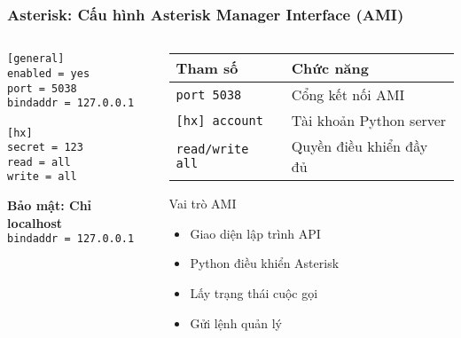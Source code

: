 \begin{frame}[fragile]
\frametitle{Asterisk: Cấu hình Asterisk Manager Interface (AMI)}

\begin{columns}[t]
\begin{column}{0.4\textwidth}
\begin{verbatim}
[general]
enabled = yes
port = 5038
bindaddr = 127.0.0.1

[hx]
secret = 123
read = all
write = all
\end{verbatim}

\vspace{0.2cm}
\begin{alertblock}{}
\centering
\footnotesize
\textbf{Bảo mật: Chỉ localhost}\\
\texttt{bindaddr = 127.0.0.1}
\end{alertblock}
\end{column}

\begin{column}{0.55\textwidth}
\begin{table}[htbp]
\centering
\scriptsize
\begin{tabular}{|l|l|}
\hline
\textbf{Tham số} & \textbf{Chức năng} \\
\hline
\texttt{port 5038} & Cổng kết nối AMI \\
\hline
\texttt{[hx] account} & Tài khoản Python server \\
\hline
\texttt{read/write all} & Quyền điều khiển đầy đủ \\
\hline
\end{tabular}
\end{table}

\vspace{0.3cm}
\begin{exampleblock}{Vai trò AMI}
\begin{itemize}
\item Giao diện lập trình API
\item Python điều khiển Asterisk  
\item Lấy trạng thái cuộc gọi
\item Gửi lệnh quản lý
\end{itemize}
\end{exampleblock}
\end{column}
\end{columns}

\end{frame}
